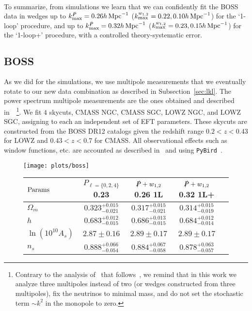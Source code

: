 \documentclass[12pt,a4paper]{article}
\def\hinvMpc{h\,{\rm Mpc}^{-1}}
\def\PA{\slashed{P}}
\renewcommand{\(}{\left(}
\renewcommand{\)}{\right)}
\newcommand{\code}[1]{\texttt{#1}}
\begin{document}
{\paragraph{} To summarize, from simulations we learn that we can {confidently} fit the BOSS data in wedges up to $k_{\rm max}^{\PA} = 0.26 \hinvMpc$ ($k_{\rm max}^{w_{1,2}} = 0.22, 0.10 \hinvMpc$) for the `1-loop' procedure, and up to $k_{\rm max}^{\PA} = 0.32 \hinvMpc$ ($k_{\rm max}^{w_{1,2}} = 0.23, 0.15 \hinvMpc$) for the `1-loop+' procedure, with a controlled theory-systematic error. 



\subsection{BOSS}
As {we did} for the simulations, we use multipole measurements that we eventually rotate to our new data combination as described in Subsection~\ref{sec:lkl}. 
The power spectrum multipole measurements are the ones obtained and described in~\cite{cf}~\footnote{Contrary to the analysis of~\cite{cf} that follows~\cite{DAmico:2019fhj,Colas:2019ret}, we remind that in this work we analyze three multipoles instead of two (or wedges constructed from three multipoles), fix the neutrinos to minimal mass, and do not set the stochastic term $\sim k^2$ in the monopole to zero. }. 
We fit $4$ skycuts, CMASS NGC, CMASS SGC, LOWZ NGC, and LOWZ SGC, {assigning to} each an independent set of EFT parameters. 
These skycuts are constructed from the BOSS DR12 catalogs given the redshift range $0.2 < z< 0.43$  for LOWZ and $0.43 < z < 0.7$ for CMASS. 
All observational effects such as window functions, etc. are accounted as described in~\cite{DAmico:2019fhj} and using \code{PyBird}~\cite{DAmico:2020kxu}. 

\begin{figure}[ht!]
\centering
\texttt{[image: plots/boss]}  \\ \vspace{0.3em}
\footnotesize
    \begin{tabular}{|l|c|c|c|c|}
     \hline 
    ${\rm Params}$ 		& $P_{\ell=\{0,2,4\}}$ 0.23 				& $\PA +  w_{1,2}$ 0.26 1L 		&  $\PA +  w_{1,2}$ 0.32 1L+ \\ \hline 
    $\Omega_{m }$ 	& $0.323^{+0.015}_{-0.021}$ 		& $0.317^{+0.015}_{-0.021}$		& $0.314^{+0.015}_{-0.019} $ \\ 
    $ h$ 			& $0.683^{+0.012}_{-0.015}$ 		& $0.686^{+0.013}_{-0.015}$		& $0.684^{+0.012}_{-0.014}   $ \\ 
    $\ln (10^{10}A_s)$& $2.87\pm 0.16$  				& $2.89\pm 0.17 $ 				& $2.89\pm 0.17              $\\ 
    $ n_s$ 			& $0.888^{+0.066}_{-0.054}  $		& $0.884^{+0.067}_{-0.058}  $		& $0.878^{+0.063}_{-0.057}   $ \\
    \hline 
    \end{tabular}
    

\end{figure}}
\end{document}

